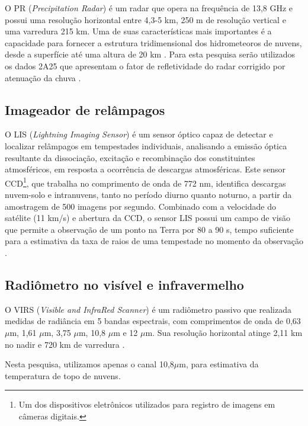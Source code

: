 O PR (\textit{Precipitation Radar}) é um radar que opera na frequência de 13,8 GHz e possui uma resolução horizontal entre 4,3-5 km, 250 m de resolução vertical e uma varredura 215 km. Uma de suas características mais importantes é a capacidade para fornecer a estrutura tridimensional dos hidrometeoros de nuvens, desde a superfície até uma altura de 20 km \cite{kummerok1998}. Para esta pesquisa serão utilizados os dados 2A25 que apresentam o fator de refletividade do radar corrigido por atenuação da chuva \cite{2A25}.

\subsection{Imageador de relâmpagos}

O LIS (\textit{Lightning Imaging Sensor}) é um sensor óptico capaz de detectar e localizar relâmpagos em tempestades individuais, analisando a emissão óptica resultante da dissociação, excitação e recombinação dos constituintes atmosféricos, em resposta a ocorrência de descargas atmosféricas. Este sensor CCD\footnote{Um dos dispositivos eletrônicos utilizados para registro de imagens em câmeras digitais.}, que trabalha no comprimento de onda de 772 nm, identifica descargas nuvem-solo e intranuvens, tanto no período diurno quanto noturno, a partir da amostragem de 500 imagens por segundo. Combinado com a velocidade do satélite (11 km/s) e abertura da CCD, o sensor LIS possui um campo de visão que permite a observação de um ponto na Terra por 80 a 90 s, tempo suficiente para a estimativa da taxa de raios de uma tempestade no momento da observação \cite{christianTM,trmmhandbook}.

\subsection{Radiômetro no visível e infravermelho}

O VIRS (\textit{Visible and InfraRed Scanner}) é um radiômetro passivo que realizada medidas de radiância em 5 bandas espectrais, com comprimentos de onda de 0,63 $\mu$m, 1,61 $\mu$m, 3,75 $\mu$m, 10,8 $\mu$m e 12 $\mu$m. Sua resolução horizontal atinge 2,11 km no nadir e 720 km de varredura \cite{trmmhandbook}.

Nesta pesquisa, utilizamos apenas o canal  10,8$\mu$m, para estimativa da temperatura de topo de nuvens.

